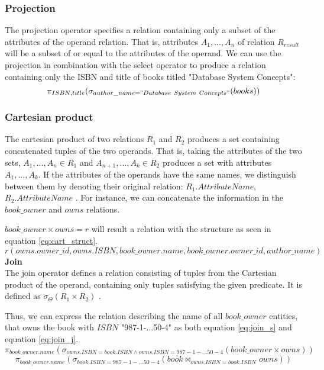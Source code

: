 \subsubsection*{Projection}
The projection operator specifies a relation containing only a subset of the attributes of the operand relation\cite{DBSBook}.
That is, attributes $A_1, ..., A_n$ of relation $R_{result}$ will be a subset of or equal to the attributes of the operand.
We can use the projection in combination with the select operator to produce a relation containing only the ISBN and title of books titled "Database System Concepts":
$$\pi_{ISBN,title} (\sigma_{author\_name = "Database\ System\ Concepts"}(books))$$
\subsubsection*{Cartesian product}
The cartesian product of two relations $R_1$ and $R_2$ produces a set containing concatenated tuples of the two operands.
That is, taking the attributes of the two sets, $A_1,...,A_n \in R_1$ and $A_{n+1},...,A_k \in R_2$ produces a set with attributes $A_1,...,A_k$.
If the attributes of the operands have the same names, we distinguish between them by denoting their original relation: $R_1.AttributeName$, $R_2.AttributeName$ \cite{DBSBook}.
For instance, we can concatenate the information in the $book\_owner$ and $owns$ relations.

$book\_owner \times owns = r$ will result a relation with the structure as seen in equation \ref{eq:cart_struct}.
\begin{equation}\label{eq:cart_struct}
    r(owns.owner\_id, owns.ISBN,book\_owner.name,book\_owner.owner\_id, author\_name)
\end{equation}
\textbf{Join}\\
The join operator defines a relation consisting of tuples from the Cartesian product of the operand, containing only tuples satisfying the given predicate.
It is defined as $\sigma_{\Theta} (R_1 \times R_2)$ \cite{DBSBook}.

Thus, we can express the relation describing the name of all $book\_owner$ entities, that owns the book with $ISBN$ "987-1-...50-4" as both equation \ref{eq:join_s} and equation \ref{eq:join_j}.
\begin{equation}\label{eq:join_s}
    \pi_{book\_owner.name} (\sigma_{owns.ISBN = book.ISBN \wedge owns.ISBN = 987-1-...50-4}  (book\_owner \times owns))
\end{equation}
\begin{equation}\label{eq:join_j}
    \pi_{book\_owner.name} (\sigma_{book.ISBN = 987-1-...50-4} (book \Join_{owns.ISBN = book.ISBN} owns))
\end{equation}\\


